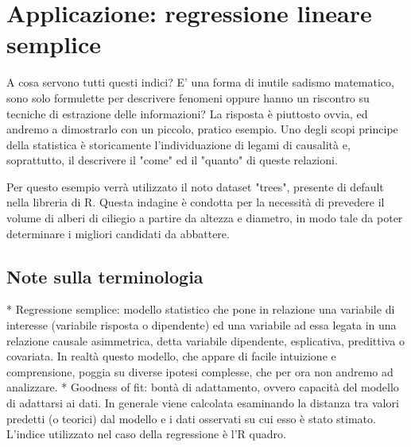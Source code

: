 \documentclass[a4paper]{article}
\begin{document}
\section{Applicazione: regressione lineare semplice}

A cosa servono tutti questi indici? E' una forma di inutile sadismo matematico, sono solo formulette per descrivere fenomeni oppure hanno un riscontro su tecniche di estrazione delle informazioni? La risposta \`{e} piuttosto ovvia, ed andremo a dimostrarlo con un piccolo, pratico esempio.
Uno degli scopi principe della statistica \`{e} storicamente l'individuazione di legami di causalit\`{a} e, soprattutto, il descrivere il "come" ed il "quanto" di queste relazioni.

Per questo esempio verr\`{a} utilizzato il noto dataset "trees", presente di default nella libreria di R. Questa indagine \`{e} condotta per la necessit\`{a} di prevedere il volume di alberi di ciliegio a partire da altezza e diametro, in modo tale da poter determinare i migliori candidati da abbattere.

\subsection{Note sulla terminologia}
* Regressione semplice: modello statistico che pone in relazione una variabile di interesse (variabile risposta o dipendente) ed una variabile ad essa legata in una relazione causale asimmetrica, detta variabile dipendente, esplicativa, predittiva o covariata. In realt\`{a} questo modello, che appare di facile intuizione e comprensione, poggia su diverse ipotesi complesse, che per ora non andremo ad analizzare.
* Goodness of fit: bont\`{a} di adattamento, ovvero capacit\`{a} del modello di adattarsi ai dati. In generale viene calcolata esaminando la distanza tra valori predetti (o teorici) dal modello e i dati osservati su cui esso \`{e} stato stimato. L'indice utilizzato nel caso della regressione \`{e} l'R quadro.



\end{document}
